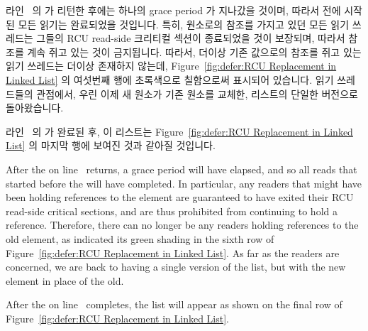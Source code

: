 \begin{fcvref}
\begin{fcvref}

라인~ 의  가 리턴한 후에는 하나의 grace
period 가 지나갔을 것이며, 따라서  전에 시작된 모든
읽기는 완료되었을 것입니다.
특히,  원소로의 참조를 가지고 있던 모든 읽기 쓰레드는 그들의 RCU
read-side 크리티컬 섹션이 종료되었을 것이 보장되며, 따라서 참조를 계속 쥐고
있는 것이 금지됩니다.
따라서, 더이상 기존 값으로의 참조를 쥐고 있는 읽기 쓰레드는 더이상 존재하지
않는데,
Figure~\ref{fig:defer:RCU Replacement in Linked List} 의 여섯번째 행에
초록색으로 칠함으로써 표시되어 있습니다.
읽기 쓰레드들의 관점에서, 우린 이제 새 원소가 기존 원소를 교체한, 리스트의
단일한 버전으로 돌아왔습니다.

라인~ 의  가 완료된 후, 이 리스트는
Figure~\ref{fig:defer:RCU Replacement in Linked List} 의 마지막 행에 보여진
것과 같아질 것입니다.
\end{fcvref}

\iffalse

After the  on line~ returns,
a grace period will have elapsed, and so all reads that started before the
 will have completed.
In particular, any readers that might have been holding references
to the  element are guaranteed to have exited
their RCU read-side critical sections, and are thus prohibited from
continuing to hold a reference.
Therefore, there can no longer be any readers holding references
to the old element, as indicated its green shading in the sixth row of
Figure~\ref{fig:defer:RCU Replacement in Linked List}.
As far as the readers are concerned, we are back to having a single version
of the list, but with the new element in place of the old.

After the  on line~ completes, the list will
appear as shown on the final row of
Figure~\ref{fig:defer:RCU Replacement in Linked List}.
\end{fcvref}

